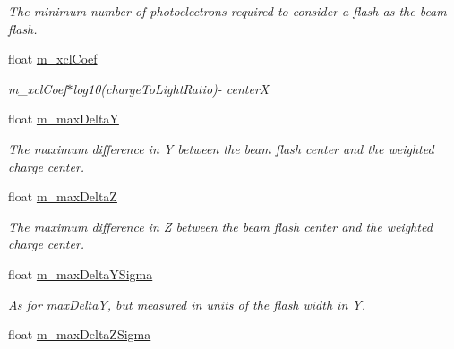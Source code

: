 \begin{DoxyCompactItemize}
\begin{DoxyCompactList}\small\item\em The minimum number of photoelectrons required to consider a flash as the beam flash. \end{DoxyCompactList}\item 
\hypertarget{classflashmatch_1_1FlashMatchingTool_ad4ea54d8957415c895afdd3575dda380}{float \hyperlink{classflashmatch_1_1FlashMatchingTool_ad4ea54d8957415c895afdd3575dda380}{m\-\_\-xcl\-Coef}}\label{classflashmatch_1_1FlashMatchingTool_ad4ea54d8957415c895afdd3575dda380}

\begin{DoxyCompactList}\small\item\em m\-\_\-xcl\-Coef$\ast$log10(charge\-To\-Light\-Ratio)-\/ center\-X \end{DoxyCompactList}\item 
\hypertarget{classflashmatch_1_1FlashMatchingTool_a859f9d3405d8f5bae13b3927e193ab91}{float \hyperlink{classflashmatch_1_1FlashMatchingTool_a859f9d3405d8f5bae13b3927e193ab91}{m\-\_\-max\-Delta\-Y}}\label{classflashmatch_1_1FlashMatchingTool_a859f9d3405d8f5bae13b3927e193ab91}

\begin{DoxyCompactList}\small\item\em The maximum difference in Y between the beam flash center and the weighted charge center. \end{DoxyCompactList}\item 
\hypertarget{classflashmatch_1_1FlashMatchingTool_a8b66b2458157a6216b83200359b6bb17}{float \hyperlink{classflashmatch_1_1FlashMatchingTool_a8b66b2458157a6216b83200359b6bb17}{m\-\_\-max\-Delta\-Z}}\label{classflashmatch_1_1FlashMatchingTool_a8b66b2458157a6216b83200359b6bb17}

\begin{DoxyCompactList}\small\item\em The maximum difference in Z between the beam flash center and the weighted charge center. \end{DoxyCompactList}\item 
\hypertarget{classflashmatch_1_1FlashMatchingTool_a255b27c95bb3d2954482e3fdc8cf3e79}{float \hyperlink{classflashmatch_1_1FlashMatchingTool_a255b27c95bb3d2954482e3fdc8cf3e79}{m\-\_\-max\-Delta\-Y\-Sigma}}\label{classflashmatch_1_1FlashMatchingTool_a255b27c95bb3d2954482e3fdc8cf3e79}

\begin{DoxyCompactList}\small\item\em As for max\-Delta\-Y, but measured in units of the flash width in Y. \end{DoxyCompactList}\item 
\hypertarget{classflashmatch_1_1FlashMatchingTool_aa5460134c0dbb87c67ca199a0ddb67ac}{float \hyperlink{classflashmatch_1_1FlashMatchingTool_aa5460134c0dbb87c67ca199a0ddb67ac}{m\-\_\-max\-Delta\-Z\-Sigma}}\label{classflashmatch_1_1FlashMatchingTool_aa5460134c0dbb87c67ca199a0ddb67ac}


\end{DoxyCompactItemize}
